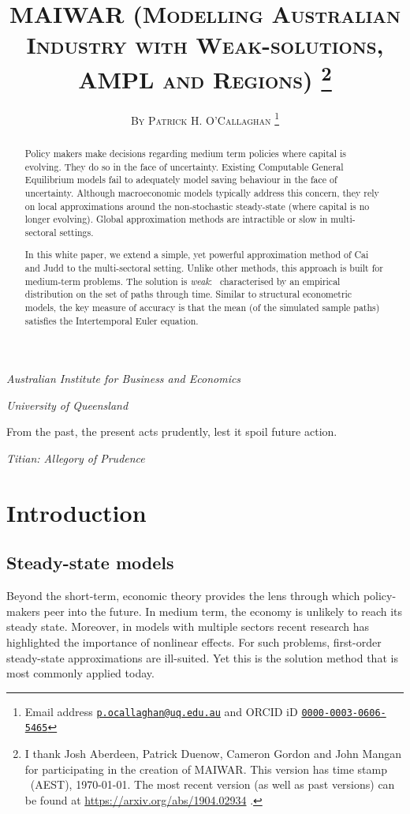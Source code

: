 \documentclass[12pt,a4paper,twoside]{article}
\title{
   \textsc{
MAIWAR (Modelling Australian Industry with Weak-solutions, AMPL and Regions)
}
\footnote{
      I thank Josh Aberdeen, Patrick Duenow, Cameron Gordon and John Mangan
      for participating in the creation of MAIWAR.
      This version has time stamp \currenttime~(AEST), \today. The most recent
      version (as well as past versions) can be found at
      \url{https://arxiv.org/abs/1904.02934} .}}
\author{\large\textsc{By Patrick H. O'Callaghan}
   \footnote{Email address
    \href{mailto:p.ocallaghan@uq.edu.au}{\texttt{p.ocallaghan@uq.edu.au}} and
    ORCID iD \href{http://orcid.org/0000-0003-0606-5465}{
      \texttt{0000-0003-0606-5465}} }}
\date{}
\makeatletter
\renewcommand\maketitle
  {\begin{center}\mdseries\large
    {\@title}%
    \par\medskip\medskip
    {\normalsize\@author}%
    \par\medskip\medskip\normalfont
    \begin{small}
\emph{Australian Institute for Business and Economics}
\end{small}
\par
\begin{small}
\emph{University of Queensland}
\end{small}
   \end{center}
  }
\makeatother
\begin{document}
  \maketitle

  \pagestyle{fancy}
\renewcommand{\abstractname}{\vspace{-\baselineskip}} \thispagestyle{plain}
%

\begin{abstract}%
  
  Policy makers make decisions regarding medium term policies where capital is
  evolving.
  They do so in the face of uncertainty.
  Existing Computable General Equilibrium models fail to adequately model
  saving behaviour in the face of uncertainty.
  Although macroeconomic models typically address this concern, they rely
  on local approximations around the non-stochastic steady-state
  (where capital is no longer evolving).
  Global approximation methods are intractible or slow in multi-sectoral
  settings.
  
  In this white paper, we extend a simple, yet 
  powerful approximation method of Cai and Judd to the
  multi-sectoral setting.
  Unlike other methods, this approach is built for medium-term
  problems.
  The solution is \emph{weak}: \ie\ characterised by an empirical 
  distribution on the set of paths through time.
  Similar to structural econometric models, the key measure of accuracy is that
  the mean (of the simulated sample paths) satisfies the Intertemporal Euler
  equation.
\end{abstract}
\setlength{\epigraphwidth}{11.5cm}
\epigraph{From the past, the present acts prudently, lest it spoil future
  action.}{\emph{Titian:  Allegory of Prudence}
}
\section{Introduction}\label{sec-introduction}

\subsection{Steady-state models}
  Beyond the short-term, economic theory provides the lens through which
  policy-makers peer into the future. 
  In medium term, the economy is unlikely to reach its steady state. 
  Moreover, in models with multiple sectors recent research has highlighted
  the importance of nonlinear effects.
  For such problems, first-order steady-state approximations are ill-suited.
  Yet this is the solution method that is most commonly applied today.
\end{document}
